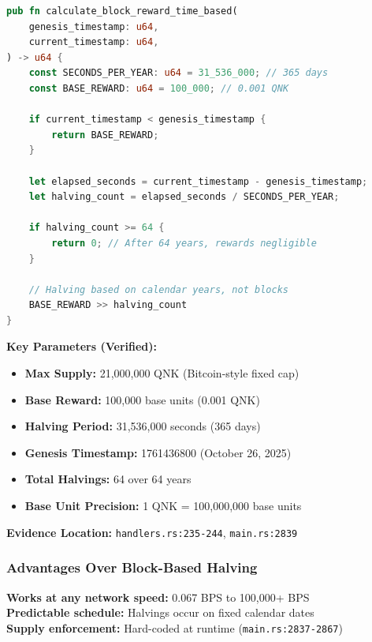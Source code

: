 \documentclass[11pt,a4paper]{article}
\begin{document}
\begin{lstlisting}[language=Rust,caption={Time-Based Halving Implementation}]
pub fn calculate_block_reward_time_based(
    genesis_timestamp: u64,
    current_timestamp: u64,
) -> u64 {
    const SECONDS_PER_YEAR: u64 = 31_536_000; // 365 days
    const BASE_REWARD: u64 = 100_000; // 0.001 QNK

    if current_timestamp < genesis_timestamp {
        return BASE_REWARD;
    }

    let elapsed_seconds = current_timestamp - genesis_timestamp;
    let halving_count = elapsed_seconds / SECONDS_PER_YEAR;

    if halving_count >= 64 {
        return 0; // After 64 years, rewards negligible
    }

    // Halving based on calendar years, not blocks
    BASE_REWARD >> halving_count
}
\end{lstlisting}

\textbf{Key Parameters (Verified):}
\begin{itemize}
    \item \textbf{Max Supply:} 21,000,000 QNK (Bitcoin-style fixed cap)
    \item \textbf{Base Reward:} 100,000 base units (0.001 QNK)
    \item \textbf{Halving Period:} 31,536,000 seconds (365 days)
    \item \textbf{Genesis Timestamp:} 1761436800 (October 26, 2025)
    \item \textbf{Total Halvings:} 64 over 64 years
    \item \textbf{Base Unit Precision:} 1 QNK = 100,000,000 base units
\end{itemize}

\textbf{Evidence Location:} \texttt{handlers.rs:235-244}, \texttt{main.rs:2839}

\subsubsection{Advantages Over Block-Based Halving}

\begin{tcolorbox}[colback=blue!5!white,colframe=blue!75!black,title=Performance Independence]
\textbf{Works at any network speed:} 0.067 BPS to 100,000+ BPS\\
\textbf{Predictable schedule:} Halvings occur on fixed calendar dates\\
\textbf{Supply enforcement:} Hard-coded at runtime (\texttt{main.rs:2837-2867})
\end{tcolorbox}
\end{document}
